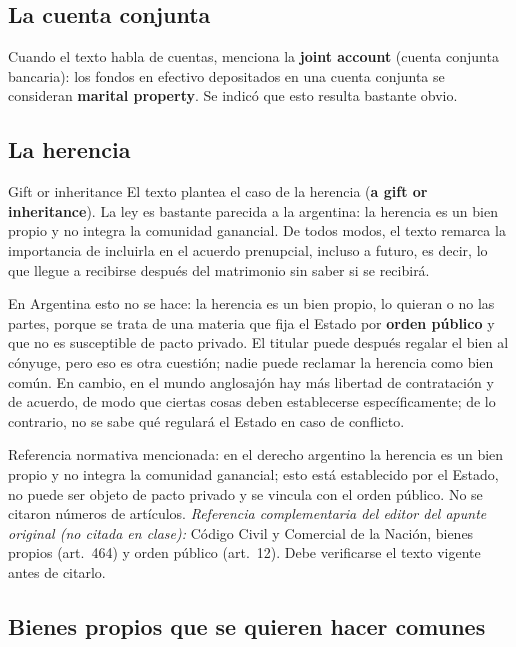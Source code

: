 \documentclass[12pt,oneside]{book}
\begin{document}
\subsection{La cuenta conjunta}

Cuando el texto habla de cuentas, menciona la \textbf{joint account} (cuenta conjunta bancaria): los fondos en efectivo depositados en una cuenta conjunta se consideran \textbf{marital property}. Se indicó que esto resulta bastante obvio.

\subsection{La herencia}

\begin{example}{Gift or inheritance}
El texto plantea el caso de la herencia (\textbf{a gift or inheritance}). La ley es bastante parecida a la argentina: la herencia es un bien propio y no integra la comunidad ganancial. De todos modos, el texto remarca la importancia de incluirla en el acuerdo prenupcial, incluso a futuro, es decir, lo que llegue a recibirse después del matrimonio sin saber si se recibirá.
\end{example}

En Argentina esto no se hace: la herencia es un bien propio, lo quieran o no las partes, porque se trata de una materia que fija el Estado por \textbf{orden público} y que no es susceptible de pacto privado. El titular puede después regalar el bien al cónyuge, pero eso es otra cuestión; nadie puede reclamar la herencia como bien común. En cambio, en el mundo anglosajón hay más libertad de contratación y de acuerdo, de modo que ciertas cosas deben establecerse específicamente; de lo contrario, no se sabe qué regulará el Estado en caso de conflicto.

\begin{note}
Referencia normativa mencionada: en el derecho argentino la herencia es un bien propio y no integra la comunidad ganancial; esto está establecido por el Estado, no puede ser objeto de pacto privado y se vincula con el orden público. No se citaron números de artículos. \textit{Referencia complementaria del editor del apunte original (no citada en clase):} Código Civil y Comercial de la Nación, bienes propios (art.~464) y orden público (art.~12). Debe verificarse el texto vigente antes de citarlo.
\end{note}

\subsection{Bienes propios que se quieren hacer comunes}
\end{document}
